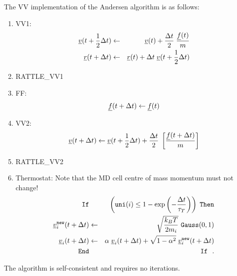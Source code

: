 The VV implementation of the Andersen algorithm is as follows:
\begin{enumerate}
\item VV1:
\begin{eqnarray}
\mbox{$\underline{v}$}(t + {1 \over 2} \Delta t) &\leftarrow& \mbox{$\underline{v}$}(t) +
{\Delta t \over 2} \; {\mbox{$\underline{f}$}(t) \over m} \nonumber \\
\mbox{$\underline{r}$}(t + \Delta t) &\leftarrow& \mbox{$\underline{r}$}(t) + \Delta t \;
\mbox{$\underline{v}$}(t + {1 \over 2} \Delta t)
\end{eqnarray}
\item RATTLE\_VV1
\item FF:
\begin{equation}
\mbox{$\underline{f}$}(t + \Delta t) \leftarrow \mbox{$\underline{f}$}(t)
\end{equation}
\item VV2:
\begin{equation}
\mbox{$\underline{v}$}(t + \Delta t) \leftarrow \mbox{$\underline{v}$}(t + {1 \over 2} \Delta t) +
{\Delta t \over 2} \; \left[{\mbox{$\underline{f}$}(t + \Delta t) \over m} \right]
\end{equation}
\item RATTLE\_VV2
\item Thermostat: Note that the MD cell centre of mass momentum must not change!
\begin{eqnarray}
{\tt If} && \left({\tt uni}(i) \le 1 - \exp \left(-\frac{\Delta t}{\tau_{T}}\right) \right)
\; {\tt Then} \nonumber \\
\mbox{$\underline{v}$}_{i}^{\tt new}(t + \Delta t) &\leftarrow&
\sqrt{\frac{k_{B}T}{2 m_{i}}}~{\tt Gauss}(0,1) \\
\mbox{$\underline{v}$}_{i}(t + \Delta t) &\leftarrow& \alpha \; \mbox{$\underline{v}$}_{i}(t + \Delta t) +
\sqrt{1-\alpha^{2}} \; \mbox{$\underline{v}$}_{i}^{\tt new}(t + \Delta t) \nonumber \\
{\tt End} && {\tt If}~~.\nonumber
\end{eqnarray}
\end{enumerate}
The algorithm is self-consistent and requires no iterations.

